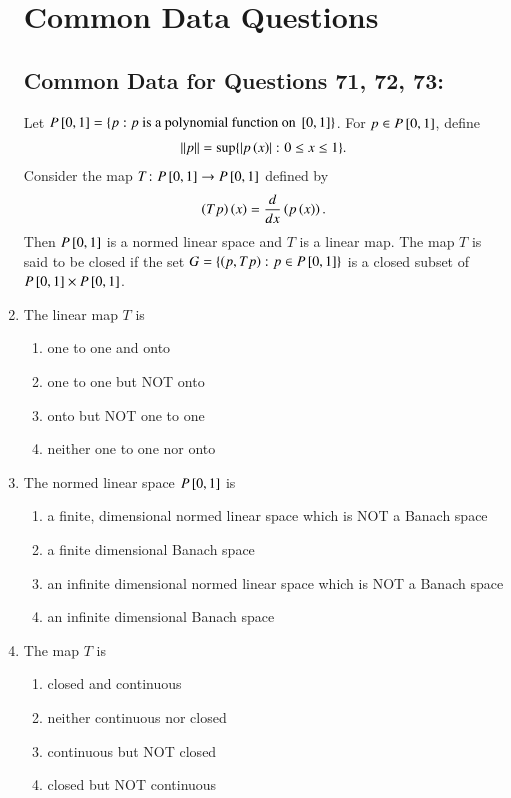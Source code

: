 \documentclass[journal]{IEEEtran}
\begin{document}
\begin{enumerate}
\section*{Common Data Questions}
\subsection*{Common Data for Questions 71, 72, 73:}
Let $P{}\left[0,1\right] = \{p: p \text{ is a polynomial function on } {}\left[0,1\right]\}$. For $p \in P{}\left[0,1\right]$, define 
\begin{align*}
    \left\vert\left\vert p\right\vert\right\vert = \text{sup} \{\left\vert p\left(x\right)\right\vert\colon 0 \leq x \leq 1\}.
\end{align*}
Consider the map $T \colon P{}\left[0,1\right] \rightarrow P{}\left[0,1\right]$ defined by
\begin{align*}
    \left(Tp\right)\left(x\right) = \frac{d}{dx}\left(p\left(x\right)\right).
\end{align*}
Then $P{}\left[0,1\right]$ is a normed linear space and $T$ is a linear map. The map $T$ is said to be closed if the set $G = \{\left(p,Tp\right) \colon p \in P{}\left[0,1\right]\}$ is a closed subset of $P{}\left[0,1\right] \times P{}\left[0,1\right]$.
\item The linear map $T$ is
\begin{multicols}{2}
    \begin{enumerate}
        \item one to one and onto
        \item one to one but NOT onto
        \item onto but NOT one to one
        \item neither one to one nor onto
    \end{enumerate}
\end{multicols}
\item The normed linear space $P{}\left[0,1\right]$ is 
\begin{multicols}{2}
    \begin{enumerate}
        \item a finite, dimensional normed linear space which is NOT a Banach space
        \item a finite dimensional Banach space
        \item an infinite dimensional normed linear space which is NOT a Banach space
        \item an infinite dimensional Banach space
    \end{enumerate}
\end{multicols}
\item The map $T$ is
\begin{multicols}{2}
    \begin{enumerate}
        \item closed and continuous
        \item neither continuous nor closed 
        \item continuous but NOT closed
        \item closed but NOT continuous
    \end{enumerate}
\end{multicols}


\end{enumerate}
\end{document}
